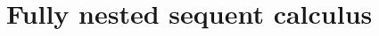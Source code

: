 \documentclass[twoside]{aiml20}
\begin{document}
%
%
%



\section{Fully nested sequent calculus}\label{sec:nested}
\end{document}
